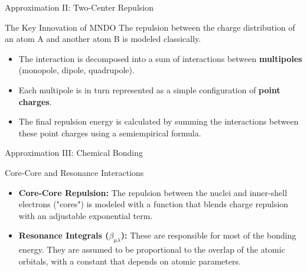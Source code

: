 \begin{frame}{Approximation II: Two-Center Repulsion}
    \begin{alertblock}{The Key Innovation of MNDO}
        The repulsion between the charge distribution of an atom A and another atom B is modeled classically.
    \end{alertblock}
    \pause
    
    \begin{itemize}
        \item The interaction is decomposed into a sum of interactions between \textbf{multipoles} (monopole, dipole, quadrupole).
        \pause
        \bigskip
        \item Each multipole is in turn represented as a simple configuration of \textbf{point charges}.
        \pause
        \bigskip
        \item The final repulsion energy is calculated by summing the interactions between these point charges using a semiempirical formula.
    \end{itemize}
\end{frame}



\begin{frame}{Approximation III: Chemical Bonding}
    \begin{block}{Core-Core and Resonance Interactions}
        \begin{itemize}
            \item \textbf{Core-Core Repulsion:} The repulsion between the nuclei and inner-shell electrons ("cores") is modeled with a function that blends charge repulsion with an adjustable exponential term.
            \pause
            \bigskip
            \item \textbf{Resonance Integrals ($\beta_{\mu\lambda}$):} These are responsible for most of the bonding energy. They are assumed to be proportional to the overlap of the atomic orbitals, with a constant that depends on atomic parameters.
        \end{itemize}
    \end{block}
\end{frame}



